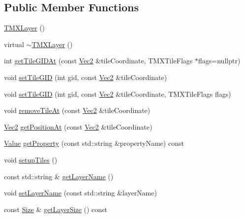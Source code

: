 \subsection*{Public Member Functions}
\begin{DoxyCompactItemize}
\item 
\hyperlink{classexperimental_1_1TMXLayer_a24b45a43f69749ee9c63e94eb0bcad96}{T\+M\+X\+Layer} ()
\item 
virtual \hyperlink{classexperimental_1_1TMXLayer_a488ce77caa72fc4ca28db81b7393c670}{$\sim$\+T\+M\+X\+Layer} ()
\item 
int \hyperlink{classexperimental_1_1TMXLayer_a29a706881c6f684bd3876ee983bc7bbe}{get\+Tile\+G\+I\+D\+At} (const \hyperlink{classVec2}{Vec2} \&tile\+Coordinate, T\+M\+X\+Tile\+Flags $\ast$flags=nullptr)
\item 
void \hyperlink{classexperimental_1_1TMXLayer_a8ed7334bacd08fd9b732b3e893d91f81}{set\+Tile\+G\+ID} (int gid, const \hyperlink{classVec2}{Vec2} \&tile\+Coordinate)
\item 
void \hyperlink{classexperimental_1_1TMXLayer_a8cbecee70344f102837c4e8dae055c0f}{set\+Tile\+G\+ID} (int gid, const \hyperlink{classVec2}{Vec2} \&tile\+Coordinate, T\+M\+X\+Tile\+Flags flags)
\item 
void \hyperlink{classexperimental_1_1TMXLayer_a185ae1ff2a7ce7069e67362fb1faa930}{remove\+Tile\+At} (const \hyperlink{classVec2}{Vec2} \&tile\+Coordinate)
\item 
\hyperlink{classVec2}{Vec2} \hyperlink{classexperimental_1_1TMXLayer_a3b433e1831ed12ae032db0124f286470}{get\+Position\+At} (const \hyperlink{classVec2}{Vec2} \&tile\+Coordinate)
\item 
\hyperlink{classValue}{Value} \hyperlink{classexperimental_1_1TMXLayer_a6ed296d4b13f396f00815266c74054ff}{get\+Property} (const std\+::string \&property\+Name) const
\item 
void \hyperlink{classexperimental_1_1TMXLayer_acf9d1ea932daf85d00dce917e40049b7}{setup\+Tiles} ()
\item 
const std\+::string \& \hyperlink{classexperimental_1_1TMXLayer_ae990c2f9653649658ae009cd6b75c8d8}{get\+Layer\+Name} ()
\item 
void \hyperlink{classexperimental_1_1TMXLayer_a4b2bc396c567d19dc300d582cfb0440d}{set\+Layer\+Name} (const std\+::string \&layer\+Name)
\item 
const \hyperlink{classSize}{Size} \& \hyperlink{classexperimental_1_1TMXLayer_a052a2a0dce9610b40cf6b7323bdcef5b}{get\+Layer\+Size} () const
\item 

\end{DoxyCompactItemize}
